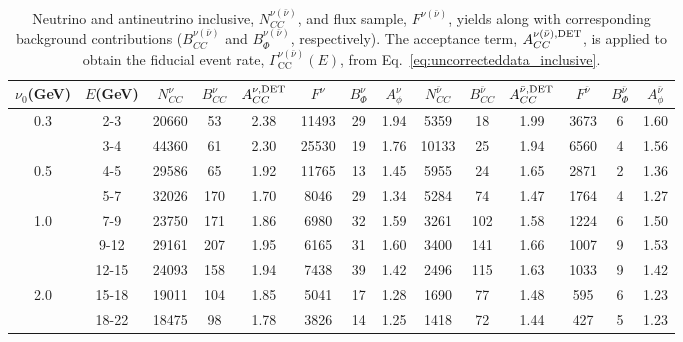 \documentclass[aps,preprint,showpacs,superscriptaddress,linenumbers,nofootinbib,prd,12pt]{revtex4}
\newcommand{\nunot}{\ensuremath{\nu_0}}
\newcommand{\gcc}{\ensuremath{\Gamma_\mathrm{CC}^{\nu(\bar{\nu})}(E)}}
\begin{document}
\begin{table}[t]
\begin{tabular}{|c |c|c c c c c c|c c c c c c|}
\hline
\nunot(GeV)&$E$(GeV) & $N^{\nu}_{CC}$  & $B^{\nu}_{CC}$ &  $A_{CC}^{\nu,\rm DET}$ &  $F^{\nu}$&  $B^{\nu}_{\Phi}$  & $A^{\nu}_{\phi}$ & $N^{\bar{\nu}}_{CC}$ & $B^{\bar{\nu}}_{CC}$ &  $A_{CC}^{\bar{\nu},\rm DET}$ &  $F^{\bar{\nu}}$& $B^{\bar{\nu}}_{\Phi}$  & $A^{\bar{\nu}}_{\phi}$ \\
\hline
0.3&2-3&20660 &53 &2.38& 11493 &29 &1.94&5359 &18 &1.99& 3673 &6 &1.60\\\hline
&3-4&44360 &61 &2.30& 25530  &19 &1.76&10133 &25 &1.94& 6560&4 &1.56\\
0.5&4-5&29586 &65 &1.92& 11765 &13 &1.45&5955 &24 &1.65& 2871&2 &1.36\\
&5-7&32026 &170 &1.70& 8046  &29 &1.34&5284 &74 &1.47& 1764 &4 &1.27\\\hline
1.0&7-9&23750 &171 &1.86& 6980  &32 &1.59&3261 &102 &1.58& 1224 &6 &1.50\\
&9-12&29161 &207 &1.95& 6165 &31 &1.60&3400 &141 &1.66& 1007 &9 &1.53\\\hline
&12-15&24093 &158 &1.94& 7438  &39 &1.42&2496 &115 &1.63& 1033&9 &1.42\\
2.0&15-18&19011 &104 &1.85& 5041 &17 &1.28&1690&77 &1.48& 595&6 &1.23\\
&18-22&18475 &98 &1.78& 3826 &14 &1.25&1418 &72 &1.44& 427&5 &1.23\\
\hline
\end{tabular}
\caption{Neutrino and antineutrino inclusive,  $N^{\nu(\bar{\nu})}_{CC}$,  and flux sample,  $F^{\nu(\bar{\nu})}$, yields along with 
corresponding background contributions ($B^{\nu(\bar{\nu})}_{CC}$ and $B^{\nu(\bar{\nu})}_{\Phi}$, respectively). The 
acceptance term, $A_{CC}^{\nu(\bar{\nu}),\rm DET}$, is applied to obtain the fiducial event rate,
$\gcc$,  from Eq.~\eqref{eq:uncorrecteddata_inclusive}.}
\label{tab:rawdata_nu}
\end{table}
\end{document}

